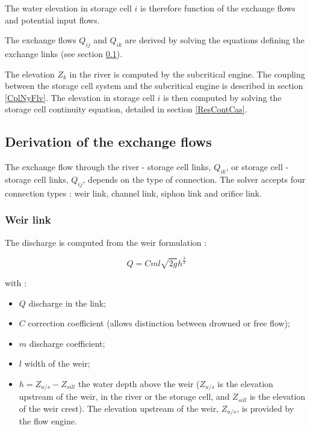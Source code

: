 \vspace{0.5cm}

The water elevation in storage cell $i$ is therefore function of the exchange flows and potential input flows.

\vspace{0.5cm}

The exchange flows $Q_{ij}$ and $Q_{ik}$ are derived by solving the equations defining the exchange links (see section \ref{DebEch}).

\vspace{0.5cm}

The elevation $Z_k$ in the river is computed by the subcritical engine. The coupling between the storage cell system and the subcritical engine is described in section \ref{CplNyFlv}. The elevation in storage cell $i$ is then computed by solving the storage cell continuity equation, detailed in section \ref{ResContCas}.

\subsection{Derivation of the exchange flows}

\label{DebEch}

The exchange flow through the river - storage cell links, $Q_{ik}$, or storage cell - storage cell links, $Q_{ij}$, depends on the type of connection. The solver accepts four connection types : weir link, channel link, siphon link and orifice link.

\subsubsection{Weir link}

The discharge is computed from the weir formulation :

\begin{equation}
 Q = C m l \sqrt{2 g} h^{\frac{3}{2}}
\end{equation}

with :
\begin{itemize}
 \item $Q$ discharge in the link;
 \item $C$ correction coefficient (allows distinction between drowned or free flow);
 \item $m$ discharge coefficient;
 \item $l$ width of the weir;
 \item $h = Z_{u/s} - Z_{sill}$ the water depth above the weir ($Z_{u/s}$ is the elevation upstream of the weir, in the river or the storage cell, and $Z_{sill}$ is the elevation of the weir crest). The elevation upstream of the weir, $Z_{u/s}$, is provided by the flow engine.
\end{itemize}

